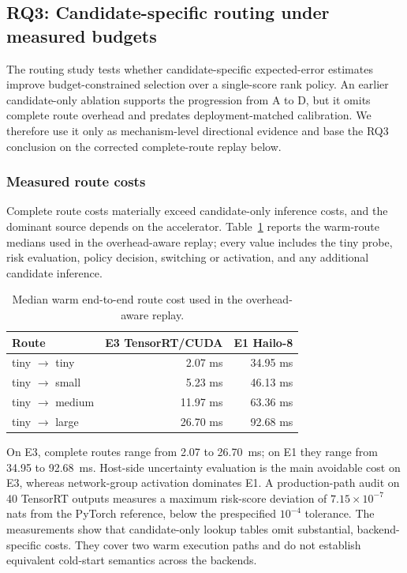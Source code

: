 \documentclass[a4paper,review,12pt]{elsarticle}
\begin{document}
\subsection{RQ3: Candidate-specific routing under measured budgets}

The routing study tests whether candidate-specific expected-error estimates improve budget-constrained selection over a single-score rank policy. An earlier candidate-only ablation supports the progression from A to D, but it omits complete route overhead and predates deployment-matched calibration. We therefore use it only as mechanism-level directional evidence and base the RQ3 conclusion on the corrected complete-route replay below.

\subsubsection{Measured route costs}

Complete route costs materially exceed candidate-only inference costs, and the dominant source depends on the accelerator. Table~\ref{tab:routes} reports the warm-route medians used in the overhead-aware replay; every value includes the tiny probe, risk evaluation, policy decision, switching or activation, and any additional candidate inference.

\begin{table}[H]
\centering
\caption{Median warm end-to-end route cost used in the overhead-aware replay.}
\label{tab:routes}
\begin{tabular}{@{}lrr@{}}
\toprule
Route & E3 TensorRT/CUDA & E1 Hailo-8 \\
\midrule
tiny $\rightarrow$ tiny & 2.07 ms & 34.95 ms \\
tiny $\rightarrow$ small & 5.23 ms & 46.13 ms \\
tiny $\rightarrow$ medium & 11.97 ms & 63.36 ms \\
tiny $\rightarrow$ large & 26.70 ms & 92.68 ms \\
\bottomrule
\end{tabular}
\end{table}

On E3, complete routes range from 2.07 to 26.70~ms; on E1 they range from 34.95 to 92.68~ms. Host-side uncertainty evaluation is the main avoidable cost on E3, whereas network-group activation dominates E1. A production-path audit on 40 TensorRT outputs measures a maximum risk-score deviation of $7.15\times10^{-7}$ nats from the PyTorch reference, below the prespecified $10^{-4}$ tolerance. The measurements show that candidate-only lookup tables omit substantial, backend-specific costs. They cover two warm execution paths and do not establish equivalent cold-start semantics across the backends.
\end{document}

